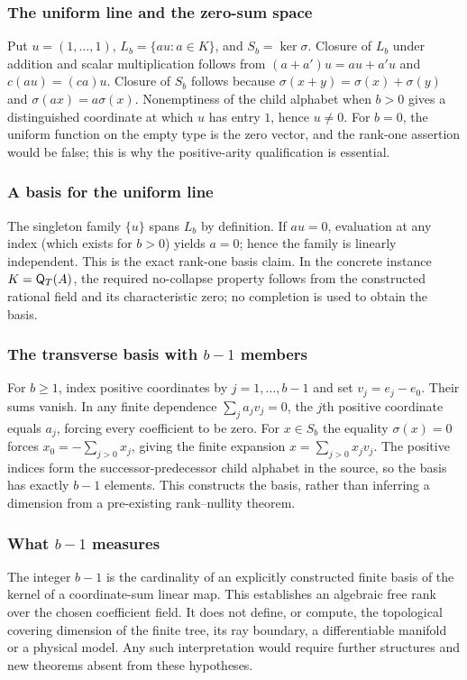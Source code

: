 \documentclass[11pt,reqno]{amsart}
\theoremstyle{definition}\newtheorem{definition}[theorem]{Definition}
\theoremstyle{remark}\newtheorem{remark}[theorem]{Remark}
\begin{document}
\medskip
\subsubsection*{The uniform line and the zero-sum space}\label{supp:8-3}
Put $u=(1,\ldots,1)$, $L_b=\{au:a\in K\}$, and $S_b=\ker\sigma$. Closure of $L_b$ under addition and scalar multiplication follows from $(a+a')u=au+a'u$ and $c(au)=(ca)u$. Closure of $S_b$ follows because $\sigma(x+y)=\sigma(x)+\sigma(y)$ and $\sigma(ax)=a\sigma(x)$. Nonemptiness of the child alphabet when $b>0$ gives a distinguished coordinate at which $u$ has entry $1$, hence $u\ne0$. For $b=0$, the uniform function on the empty type is the zero vector, and the rank-one assertion would be false; this is why the positive-arity qualification is essential.
\medskip
\medskip
\subsubsection*{A basis for the uniform line}\label{supp:8-5}
The singleton family $\{u\}$ spans $L_b$ by definition. If $au=0$, evaluation at any index (which exists for $b>0$) yields $a=0$; hence the family is linearly independent. This is the exact rank-one basis claim. In the concrete instance $K=\mathsf Q_T(A)$, the required no-collapse property follows from the constructed rational field and its characteristic zero; no completion is used to obtain the basis.
\medskip
\medskip
\subsubsection*{The transverse basis with $b-1$ members}\label{supp:8-6}
For $b\ge1$, index positive coordinates by $j=1,\ldots,b-1$ and set $v_j=e_j-e_0$. Their sums vanish. In any finite dependence $\sum_j a_jv_j=0$, the $j$th positive coordinate equals $a_j$, forcing every coefficient to be zero. For $x\in S_b$ the equality $\sigma(x)=0$ forces $x_0=-\sum_{j>0}x_j$, giving the finite expansion $x=\sum_{j>0}x_jv_j$. The positive indices form the successor-predecessor child alphabet in the source, so the basis has exactly $b-1$ elements. This constructs the basis, rather than inferring a dimension from a pre-existing rank--nullity theorem.
\medskip
\medskip
\subsubsection*{What $b-1$ measures}\label{supp:8-9}
The integer $b-1$ is the cardinality of an explicitly constructed finite basis of the kernel of a coordinate-sum linear map. This establishes an algebraic free rank over the chosen coefficient field. It does not define, or compute, the topological covering dimension of the finite tree, its ray boundary, a differentiable manifold or a physical model. Any such interpretation would require further structures and new theorems absent from these hypotheses.
\medskip
\end{document}
